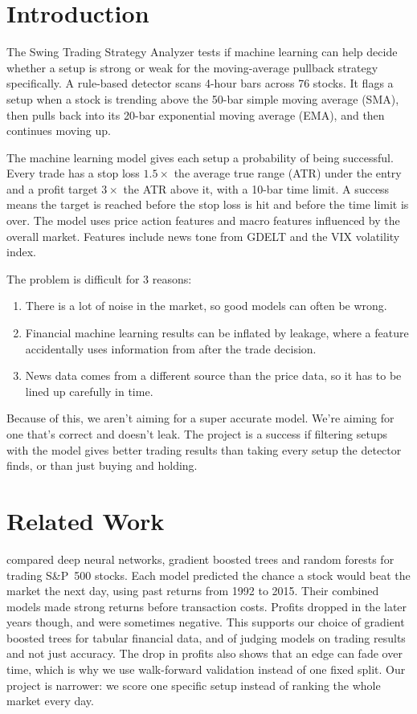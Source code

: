 \section{Introduction}

The Swing Trading Strategy Analyzer tests if machine learning can help decide whether a setup is strong or weak for the moving-average pullback strategy specifically. A rule-based detector scans 4-hour bars across 76 stocks. It flags a setup when a stock is trending above the 50-bar simple moving average (SMA), then pulls back into its 20-bar exponential moving average (EMA), and then continues moving up.

The machine learning model gives each setup a probability of being successful. Every trade has a stop loss $1.5\times$ the average true range (ATR) under the entry and a profit target $3\times$ the ATR above it, with a 10-bar time limit. A success means the target is reached before the stop loss is hit and before the time limit is over. The model uses price action features and macro features influenced by the overall market. Features include news tone from GDELT and the VIX volatility index.

The problem is difficult for 3 reasons:
\begin{enumerate}
  \item There is a lot of noise in the market, so good models can often be wrong.
  \item Financial machine learning results can be inflated by leakage, where a feature accidentally uses information from after the trade decision.
  \item News data comes from a different source than the price data, so it has to be lined up carefully in time.
\end{enumerate}

Because of this, we aren't aiming for a super accurate model. We're aiming for one that's correct and doesn't leak. The project is a success if filtering setups with the model gives better trading results than taking every setup the detector finds, or than just buying and holding.

\section{Related Work}

\citet{krauss2017deep} compared deep neural networks, gradient boosted trees and random forests for trading S\&P~500 stocks. Each model predicted the chance a stock would beat the market the next day, using past returns from 1992 to 2015. Their combined models made strong returns before transaction costs. Profits dropped in the later years though, and were sometimes negative. This supports our choice of gradient boosted trees for tabular financial data, and of judging models on trading results and not just accuracy. The drop in profits also shows that an edge can fade over time, which is why we use walk-forward validation instead of one fixed split. Our project is narrower: we score one specific setup instead of ranking the whole market every day.

